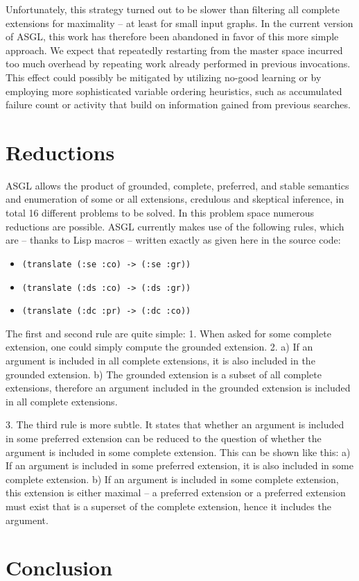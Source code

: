 \documentclass[runningheads,a4paper]{llncs}
\begin{document}
Unfortunately, this strategy turned out to be slower than filtering
all complete extensions for maximality -- at least for small input
graphs. In the current version of ASGL, this work has therefore been
abandoned in favor of this more simple approach. We expect that
repeatedly restarting from the master space incurred too much overhead
by repeating work already performed in previous invocations. This
effect could possibly be mitigated by utilizing no-good learning or by
employing more sophisticated variable ordering heuristics, such as
accumulated failure count or activity that build on
information gained from previous searches.

\section{Reductions}\label{sec:reductions}

ASGL allows the product of grounded, complete, preferred, and stable
semantics and enumeration of some or all extensions, credulous and
skeptical inference, in total 16 different problems to be solved. In
this problem space numerous reductions are possible. ASGL currently
makes use of the following rules, which are -- thanks to Lisp macros
-- written exactly as given here in the source code:

\begin{itemize}
\item \texttt{(translate (:se :co) -> (:se :gr))}
\item \texttt{(translate (:ds :co) -> (:ds :gr))}
\item \texttt{(translate (:dc :pr) -> (:dc :co))}
\end{itemize}

The first and second rule are quite simple: 1. When asked for some
complete extension, one could simply compute the grounded
extension. 2. a) If an argument is included in all complete extensions,
it is also included in the grounded extension. b) The grounded extension
is a subset of all complete extensions, therefore an argument included
in the grounded extension is included in all complete extensions.

3. The third rule is more subtle. It states that whether an argument
is included in some preferred extension can be reduced to the question
of whether the argument is included in some complete extension. This
can be shown like this: a) If an argument is included in some
preferred extension, it is also included in some complete
extension. b) If an argument is included in some complete extension,
this extension is either maximal -- a preferred extension or a
preferred extension must exist that is a superset of the complete
extension, hence it includes the argument.

\section{Conclusion}\label{sec:conclusion}

{}

\end{document}
